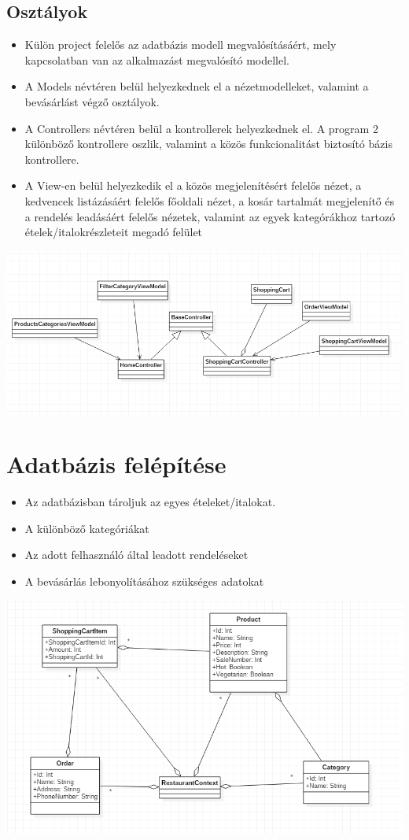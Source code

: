 \documentclass[12pt,a4paper]{article}
\begin{document}
\subsection{Osztályok}
\begin{itemize}
\item Külön project felelős az adatbázis modell megvalósításáért, mely kapcsolatban van az alkalmazást megvalósító modellel. 
\item A Models névtéren belül helyezkednek el a nézetmodelleket,  valamint a bevásárlást végző osztályok.
\item A Controllers névtéren belül a kontrollerek helyezkednek el. A program 2 különböző kontrollere oszlik, valamint a közös funkcionalitást biztosító bázis kontrollere.
\item A View-en belül helyezkedik el a közös megjelenítésért felelős nézet, a kedvencek listázásáért felelős főoldali nézet,  a kosár tartalmát megjelenítő és a rendelés leadásáért felelős nézetek, valamint az egyek kategórákhoz tartozó ételek/italokrészleteit megadó felület
\end{itemize}
\includegraphics[scale=0.5]{classdiagram}

\section{Adatbázis felépítése}
\begin{itemize}
\item Az adatbázisban tároljuk az egyes ételeket/italokat.
\item A különböző kategóriákat
\item Az adott felhasználó által leadott rendeléseket
\item A bevásárlás lebonyolításához szükséges adatokat
\end{itemize}
\includegraphics[scale=0.5]{database}
\end{document}
